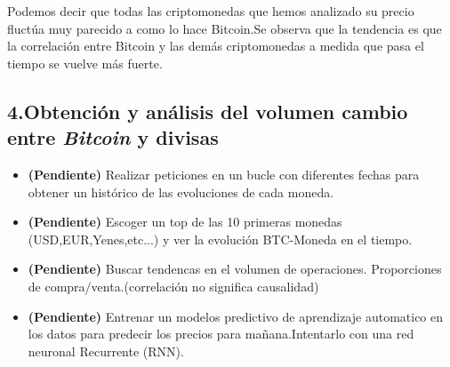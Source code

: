 \documentclass[11pt]{article}
\providecommand{\tightlist}{%
      \setlength{\itemsep}{0pt}\setlength{\parskip}{0pt}}
\begin{document}
Podemos decir que todas las criptomonedas que hemos analizado su precio
fluctúa muy parecido a como lo hace Bitcoin.Se observa que la tendencia
es que la correlación entre Bitcoin y las demás criptomonedas a medida
que pasa el tiempo se vuelve más fuerte.

    \subsection{\texorpdfstring{4.Obtención y análisis del volumen cambio
entre \emph{Bitcoin} y
divisas}{4.Obtención y análisis del volumen cambio entre Bitcoin y divisas}}\label{obtenciuxf3n-y-anuxe1lisis-del-volumen-cambio-entre-bitcoin-y-divisas}

\begin{itemize}
\tightlist
\item
  \textbf{(Pendiente)} Realizar peticiones en un bucle con diferentes
  fechas para obtener un histórico de las evoluciones de cada moneda.\\
\item
  \textbf{(Pendiente)} Escoger un top de las 10 primeras monedas
  (USD,EUR,Yenes,etc...) y ver la evolución BTC-Moneda en el tiempo.\\
\item
  \textbf{(Pendiente)} Buscar tendencas en el volumen de operaciones.
  Proporciones de compra/venta.(correlación no significa causalidad)
\item
  \textbf{(Pendiente)} Entrenar un modelos predictivo de aprendizaje
  automatico en los datos para predecir los precios para
  mañana.Intentarlo con una red neuronal Recurrente (RNN).
\end{itemize}


    
    
    
    
\end{document}
